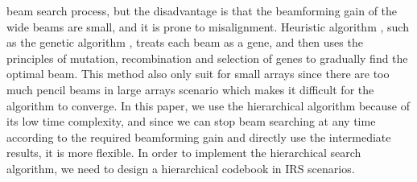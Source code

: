 \documentclass[12pt,draftclsnofoot,onecolumn]{IEEEtran}
\begin{document}
beam search process, but the disadvantage is that the beamforming gain of the wide beams are small, and it is prone to misalignment.
	Heuristic algorithm \cite{DBLP:conf/pimrc/GuoMS17, DBLP:journals/tvt/GaoDYW16, DBLP:conf/ncc/JainRKS22}, such as the  genetic algorithm \cite{DBLP:conf/wiopt/GuoMS17, DBLP:journals/wicomm/GuoMS18},  treats each beam as a gene, and then uses the principles of mutation, recombination and selection of genes to  gradually find the optimal beam. This method also only suit for small arrays since there are too much pencil beams in large arrays scenario which makes it difficult for the algorithm to converge. In this paper, we use the hierarchical algorithm because of its low time complexity, and since we can stop beam searching at any time according to the required beamforming gain and directly use the intermediate results, it is more flexible. In order to implement the hierarchical search algorithm, we need to design a hierarchical codebook in IRS scenarios.
\end{document}
